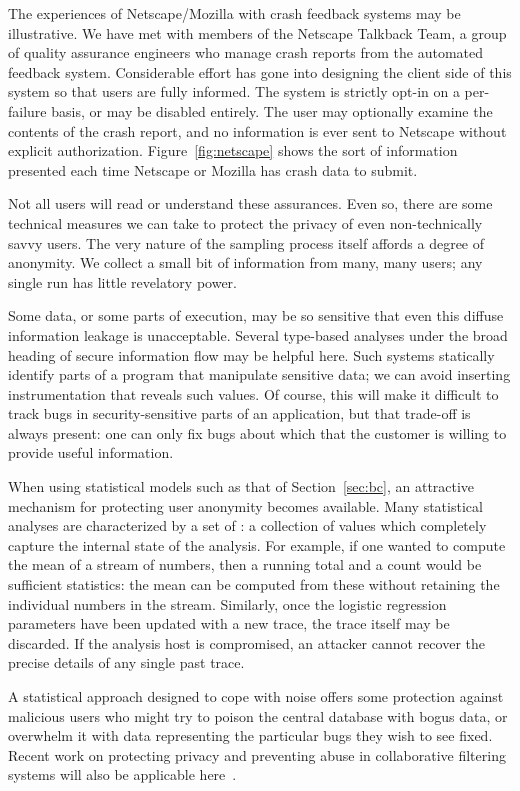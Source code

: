 The experiences of Netscape/Mozilla with crash feedback systems may be
illustrative.  We have met with members of the Netscape Talkback Team,
a group of quality assurance engineers who manage crash reports from
the automated feedback system.  Considerable effort has gone into
designing the client side of this system so that users are fully
informed.  The system is strictly opt-in on a per-failure basis, or
may be disabled entirely.  The user may optionally examine the
contents of the crash report, and no information is ever sent to
Netscape without explicit authorization.  Figure~\ref{fig:netscape}
shows the sort of information presented each time Netscape or Mozilla
has crash data to submit.

Not all users will read or understand these assurances.  Even so,
there are some technical measures we can take to protect the privacy
of even non-technically savvy users.  The very nature of the sampling
process itself affords a degree of anonymity.  We collect a small bit
of information from many, many users; any single run has little
revelatory power.

Some data, or some parts of execution, may be so sensitive that even
this diffuse information leakage is unacceptable.  Several type-based
analyses under the broad heading of secure information flow
\cite{Broadwell:2003:SSGSCI,1997:tapsoft:volpano,ZdZhNyMy2001} may be
helpful here.  Such systems statically identify parts of a program
that manipulate sensitive data; we can avoid inserting instrumentation
that reveals such values.  Of course, this will make it difficult to
track bugs in security-sensitive parts of an application, but that
trade-off is always present: one can only fix bugs about which that
the customer is willing to provide useful information.

When using statistical models such as that of Section~\ref{sec:bc}, an
attractive mechanism for protecting user anonymity becomes available.
Many statistical analyses are characterized by a set of
: a collection of values which
completely capture the internal state of the analysis.  For example,
if one wanted to compute the mean of a stream of numbers, then a
running total and a count would be sufficient statistics: the mean can
be computed from these without retaining the individual numbers in the
stream.  Similarly, once the logistic regression parameters have been
updated with a new trace, the trace itself may be discarded.  If the
analysis host is compromised, an attacker cannot recover the precise
details of any single past trace.

A statistical approach designed to cope with noise offers some
protection against malicious users who might try to poison the central
database with bogus data, or overwhelm it with data representing the
particular bugs they wish to see fixed.  Recent work on protecting
privacy and preventing abuse in collaborative filtering systems will
also be applicable here~\cite{Canny2002,EC00*150}.


